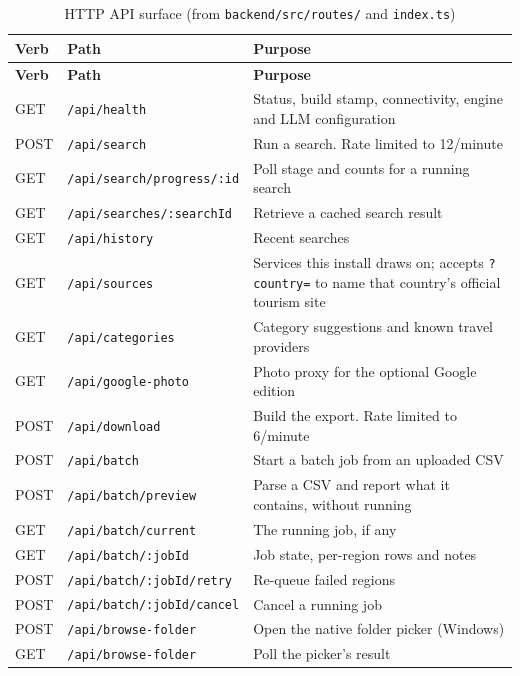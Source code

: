 \documentclass[11pt,a4paper]{report}
\newcommand{\code}[1]{\texttt{\small #1}}
\DeclareRobustCommand{\file}[1]{{\small\nolinkurl{#1}}}
\begin{document}
\begin{longtable}{@{}>{\raggedright\arraybackslash}p{1.3cm}>{\raggedright\arraybackslash}p{5.0cm}>{\raggedright\arraybackslash}p{8.4cm}@{}}
\caption{HTTP API surface (from \file{backend/src/routes/} and \file{index.ts})}\label{tab:api}\\
\toprule
\textbf{Verb} & \textbf{Path} & \textbf{Purpose}\\
\midrule
\endfirsthead
\toprule
\textbf{Verb} & \textbf{Path} & \textbf{Purpose}\\
\midrule
\endhead
\bottomrule
\endfoot
GET  & \file{/api/health}               & Status, build stamp, connectivity, engine and LLM configuration\\
POST & \code{/api/search}               & Run a search. Rate limited to 12/minute\\
GET  & \file{/api/search/progress/:id}  & Poll stage and counts for a running search\\
GET  & \code{/api/searches/:searchId}   & Retrieve a cached search result\\
GET  & \code{/api/history}              & Recent searches\\
GET  & \code{/api/sources}              & Services this install draws on; accepts \code{?country=} to name that country's official tourism site\\
GET  & \code{/api/categories}           & Category suggestions and known travel providers\\
GET  & \code{/api/google-photo}         & Photo proxy for the optional Google edition\\
POST & \code{/api/download}             & Build the export. Rate limited to 6/minute\\
POST & \code{/api/batch}                & Start a batch job from an uploaded CSV\\
POST & \code{/api/batch/preview}        & Parse a CSV and report what it contains, without running\\
GET  & \code{/api/batch/current}        & The running job, if any\\
GET  & \file{/api/batch/:jobId}         & Job state, per-region rows and notes\\
POST & \code{/api/batch/:jobId/retry}   & Re-queue failed regions\\
POST & \code{/api/batch/:jobId/cancel}  & Cancel a running job\\
POST & \code{/api/browse-folder}        & Open the native folder picker (Windows)\\
GET  & \code{/api/browse-folder}        & Poll the picker's result\\
\end{longtable}
\end{document}
